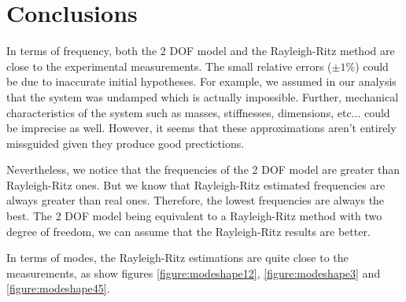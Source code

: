 \documentclass[a4paper, 12pt]{article}
\begin{document}
	\section*{Conclusions}
	In terms of frequency, both the 2 DOF model and the Rayleigh-Ritz method are close to the experimental measurements. The small relative errors ($\pm 1 \%$) could be due to inaccurate initial hypotheses. For example, we assumed in our analysis that the system was undamped which is actually impossible. Further, mechanical characteristics of the system such as masses, stiffnesses, dimensions, etc... could be imprecise as well. However, it seems that these approximations aren't entirely missguided given they produce good prectictions. \par
	Nevertheless, we notice that the frequencies of the 2 DOF model are greater than Rayleigh-Ritz ones. But we know that Rayleigh-Ritz estimated frequencies are always greater than real ones. Therefore, the lowest frequencies are always the best. The 2 DOF model being equivalent to a Rayleigh-Ritz method with two degree of freedom, we can assume that the Rayleigh-Ritz results are better. \par
	In terms of modes, the Rayleigh-Ritz estimations are quite close to the measurements, as show figures \ref{figure:modeshape12}, \ref{figure:modeshape3} and \ref{figure:modeshape45}.
\end{document}
